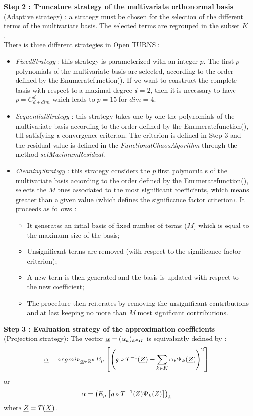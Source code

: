 {\bf Step 2 : Truncature strategy of the multivariate orthonormal basis} (Adaptive strategy) : a strategy must be chosen for the selection of the different terms of the multivariate basis. The selected terms are regrouped in the subset $K$.\\
There is three different strategies in Open TURNS :
\begin{itemize}
\item   {\itshape FixedStrategy} : this strategy is parameterized with an integer $p$. The first $p$ polynomials of the multivariate basis are selected, according to the order defined by the Enumeratefunction(). If we want to construct the complete basis with respect to a maximal degree $d = 2$, then it is necessary to have $p = C_{d+dim}^d$ which leads to $p=15$ for $dim=4$.
\item   {\itshape SequentialStrategy} : this strategy takes one by one the polynomials of the multivariate basis according to the order defined by the Enumeratefunction(), till satisfying a convergence criterion. The criterion is defined in Step 3 and the residual value is defined in the {\itshape FunctionalChaosAlgorithm} through the method {\itshape setMaximumResidual}.
\item   {\itshape CleaningStrategy} : this strategy considers the $p$  first polynomials of the multivariate basis according to the order defined by the Enumeratefunction(), selects the $M$ ones associated to the most significant coefficients, which means greater than a given value (which defines the significance factor criterion). It proceeds as follows :
  \begin{itemize}
  \item It generates an intial basis of fixed number of terms ($M$) which is equal to the maximum size of the basis;
  \item Unsignificant terms are removed (with respect to the significance factor criterion);
  \item A new term is then generated and the basis is updated with respect to the new coefficient;
  \item The procedure then reiterates by removing the unsignificant contributions and at last keeping no more than $M$ most significant contributions.
  \end{itemize}
\end{itemize}
\vspace*{0.1cm}

{\bf Step 3 : Evaluation strategy of the approximation coefficients} (Projection strategy): The vector  ${\underline{\alpha}} = (\alpha_k)_{k \in K}$  is  equivalently defined by : 
\begin{equation}\label{defArgMin} 
{\underline{\alpha}} = argmin_{{\underline{\alpha}} \in \mathbb{R}^K} E_{\mu} \left[ \left( g \circ T^{-1}({\underline{Z}}) -  \sum_{k \in K} \alpha_k \Psi_k ({\underline{Z}})\right)^2  \right]
\end{equation}
or 
\begin{equation}\label{defEsp}
{\underline{\alpha}} = \left( E_{\mu} \left[ g \circ T^{-1}({\underline{Z}}) \Psi_k ({\underline{Z}}) \right]\right)_k
\end{equation}
where ${\underline{Z}} = T({\underline{X}})$.\\


